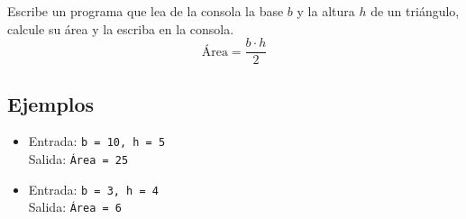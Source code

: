 Escribe un programa que lea de la consola la base \(b\) y la altura \(h\) de un triángulo, calcule su área y la escriba en la consola.\\
\[
\text{Área} = \frac{b \cdot h}{2}
\]
\subsection*{Ejemplos}
\begin{itemize}
    \item Entrada: \texttt{b = 10, h = 5}\\
          Salida: \texttt{Área = 25}
    \item Entrada: \texttt{b = 3, h = 4}\\
          Salida: \texttt{Área = 6}
\end{itemize}